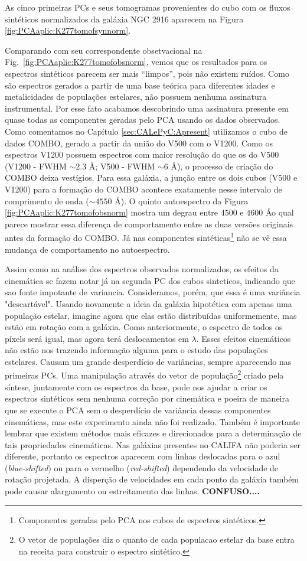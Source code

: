 As cinco primeiras PCs e
seus tomogramas provenientes do cubo com os fluxos sintéticos normalizados da galáxia NGC 2916 aparecem na Figura
\ref{fig:PCAaplic:K277tomofsynnorm}.

Comparando com seu correspondente obsetvacional na Fig.\ \ref{fig:PCAaplic:K277tomofobsnorm}, vemos que os resultados para os espectros sintéticos parecem ser mais ``limpos'', pois não existem
ruídos. Como são espectros gerados a partir de uma base teórica para diferentes idades e metalicidades de
populações estelares,  não possuem nenhuma assinatura instrumental. Por esse fato acabamos descobrindo uma
assinatura presente em quase todas as componentes geradas pelo PCA usando os dados observados. Como comentamos no
Capítulo \ref{sec:CALePyC:Apresent} utilizamos o cubo de dados COMBO, gerado a partir da união do V500 com o V1200. Como
os espectros V1200 possuem espectros com maior resolução do que os do V500 (V1200 - FWHM $\sim 2.3$ \AA; V500 - FWHM
$\sim 6$ \AA), o processo de criação do COMBO deixa vestígios. Para essa galáxia, a junção entre os dois cubos (V500 e
V1200) para a formação do COMBO acontece exatamente nesse intervalo de comprimento de onda ($\sim 4550$ \AA). O quinto autoespectro da
Figura \ref{fig:PCAaplic:K277tomofobsnorm} mostra um degrau entre $4500$ e $4600$ \AA o qual parece mostrar essa
diferença de comportamento entre as duas versões originais antes da formação do COMBO.  Já nas componentes sintéticas\footnote{Componentes geradas pelo PCA nos cubos de
espectros sintéticos.} não se vê essa mudança de comportamento no autoespectro.


Assim como na análise dos espectros observados normalizados, os efeitos da cinemática se fazem notar já na segunda PC dos cubos sinteticos, indicando que sao fonte impotante de variancia. Consideramos, porém, que essa é uma variância "descartável". Usando novamente a ideia da galáxia hipotética com
apenas uma população estelar, imagine agora que elas estão distribuídas uniformemente, mas estão em rotação com a
galáxia. Como anteriormente, o espectro de todos os píxels será igual, mas agora terá deslocamentos em $\lambda$. Esses
efeitos cinemáticos não estão nos trazendo informação alguma para o estudo das populações estelares. Causam um grande
desperdício de variâncias, sempre aparecendo nas primeiras PCs. Uma manipulação através do vetor de população\footnote{O
vetor de populações diz o quanto de cada populacao estelar da base entra na receita para construir o espectro sintético.} criado
pela síntese, juntamente com os espectros da base, pode nos ajudar a criar os espectros sintéticos sem nenhuma correção
por cinemática e poeira de maneira que se execute o PCA sem o desperdício de variância dessas componentes cinemáticas, mas este experimento ainda não foi realizado.
Também é importante lembrar que existem métodos mais eficazes e direcionados para a determinação de tais propriedades
cinemáticas. Nas galáxias presentes no CALIFA não poderia ser diferente, portanto os espectros aparecem com linhas
deslocadas para o azul ({\em blue-shifted}) ou para o vermelho ({\em red-shifted}) dependendo da velocidade de rotação
projetada. A disperção de velocidades em cada ponto da galáxia também pode causar alargamento ou estreitamento das
linhas. {\bf\ojo CONFUSO....}

